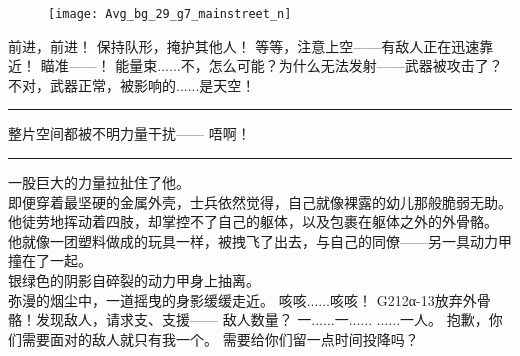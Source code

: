 \documentclass[openany]{book}
\begin{document}
\begin{dialogue}
    \begin{figure}[h]
        \centering
        \texttt{[image: Avg\_bg\_29\_g7\_mainstreet\_n]}
    \end{figure}
     前进，前进！
     保持队形，掩护其他人！
     等等，注意上空——有敌人正在迅速靠近！
     瞄准——！
     能量束......不，怎么可能？为什么无法发射——武器被攻击了？
     不对，武器正常，被影响的......是天空！
    \par\noindent\rule{\textwidth}{0.4pt}
     整片空间都被不明力量干扰——
     唔啊！
    \par\noindent\rule{\textwidth}{0.4pt}\par
    一股巨大的力量拉扯住了他。\\
    即便穿着最坚硬的金属外壳，士兵依然觉得，自己就像裸露的幼儿那般脆弱无助。\\
    他徒劳地挥动着四肢，却掌控不了自己的躯体，以及包裹在躯体之外的外骨骼。\\
    他就像一团塑料做成的玩具一样，被拽飞了出去，与自己的同僚——另一具动力甲撞在了一起。\\
    银绿色的阴影自碎裂的动力甲身上抽离。\\
    弥漫的烟尘中，一道摇曳的身影缓缓走近。
     咳咳......咳咳！
     G212α-13放弃外骨骼！发现敌人，请求支、支援——
     敌人数量？
     一......一......
     ......一人。
     抱歉，你们需要面对的敌人就只有我一个。
     需要给你们留一点时间投降吗？
\end{dialogue}
\end{document}
